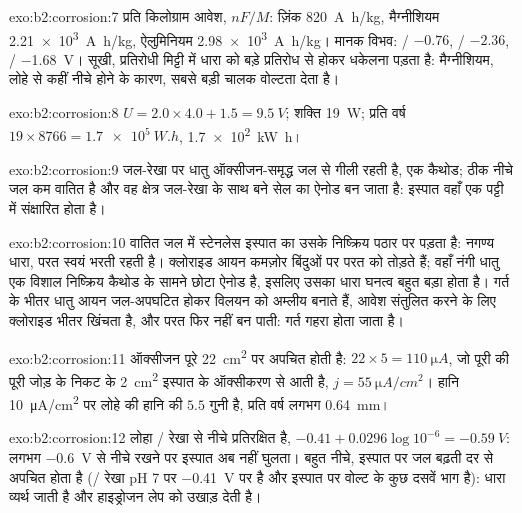 \begin{solution}{exo:b2:corrosion:7}
प्रति किलोग्राम आवेश, $nF/M$: ज़िंक \qty{820}{A.h/kg}, मैग्नीशियम \qty{2.21e3}{A.h/kg},
ऐलुमिनियम \qty{2.98e3}{A.h/kg}। मानक विभव: / $-0.76$,
/ $-2.36$, / \qty{-1.68}{V}। सूखी, प्रतिरोधी मिट्टी में
धारा को बड़े प्रतिरोध से होकर धकेलना पड़ता है: मैग्नीशियम, लोहे से कहीं
नीचे होने के कारण, सबसे बड़ी चालक वोल्टता देता है।
\end{solution}

\begin{solution}{exo:b2:corrosion:8}
$U = 2.0 \times 4.0 + 1.5 = \qty{9.5}{V}$; शक्ति \qty{19}{W}; प्रति वर्ष $19 \times
8766 = \qty{1.7e5}{W.h}$, \qty{1.7e2}{kW.h}।
\end{solution}

\begin{solution}{exo:b2:corrosion:9}
जल-रेखा पर धातु ऑक्सीजन-समृद्ध जल से गीली रहती है, एक कैथोड; ठीक
नीचे जल कम वातित है और वह क्षेत्र जल-रेखा के साथ बने सेल का ऐनोड बन जाता है:
इस्पात वहाँ एक पट्टी में संक्षारित होता है।
\end{solution}

\begin{solution}{exo:b2:corrosion:10}
वातित जल में स्टेनलेस इस्पात का  उसके
निष्क्रिय पठार पर पड़ता है: नगण्य धारा, परत स्वयं भरती रहती है। क्लोराइड आयन
कमज़ोर बिंदुओं पर परत को तोड़ते हैं; वहाँ नंगी धातु एक विशाल निष्क्रिय कैथोड के
सामने छोटा ऐनोड है, इसलिए उसका धारा घनत्व बहुत बड़ा होता है। गर्त के भीतर
धातु आयन जल-अपघटित होकर विलयन को अम्लीय बनाते हैं, आवेश संतुलित करने के लिए क्लोराइड भीतर
खिंचता है, और परत फिर नहीं बन पाती: गर्त गहरा होता जाता है।
\end{solution}

\begin{solution}{exo:b2:corrosion:11}
ऑक्सीजन पूरे \qty{22}{cm^2} पर अपचित होती है:  $22 \times 5 =
\qty{110}{\micro A}$, जो पूरी की पूरी जोड़ के निकट के \qty{2}{cm^2} इस्पात के ऑक्सीकरण
से आती है, $j = \qty{55}{\micro A/cm^2}$। हानि \qty{10}{\micro A/cm^2} पर लोहे की हानि
की $5.5$ गुनी है, प्रति वर्ष लगभग \qty{0.64}{mm}।
\end{solution}

\begin{solution}{exo:b2:corrosion:12}
लोहा / रेखा से नीचे प्रतिरक्षित है, $-0.41 + 0.0296\log 10^{-6} =
\qty{-0.59}{V}$: लगभग \qty{-0.6}{V} से नीचे रखने पर इस्पात अब नहीं घुलता। बहुत
नीचे, इस्पात पर जल बढ़ती दर से अपचित होता है (/ रेखा pH 7 पर
\qty{-0.41}{V} पर है और इस्पात पर  वोल्ट के कुछ दसवें भाग है):
धारा व्यर्थ जाती है और हाइड्रोजन लेप को उखाड़ देती है।
\end{solution}

